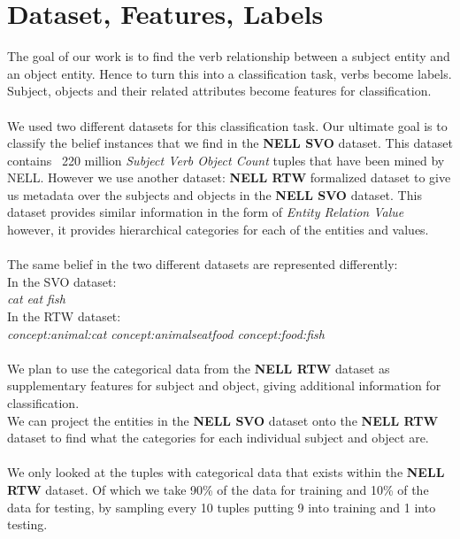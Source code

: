 \section{Dataset, Features, Labels}

The goal of our work is to find the verb relationship between a subject entity and an object entity. Hence to turn this into a classification task, verbs become labels. Subject, objects and their related attributes become features for classification.\\
\\
We used two different datasets for this classification task. Our ultimate goal is to classify the belief instances that we find in the \textbf{NELL SVO} dataset. This dataset contains ~220 million \emph{Subject Verb Object Count} tuples that have been mined by NELL. However we use another dataset: \textbf{NELL RTW} formalized dataset to give us metadata over the subjects and objects in the \textbf{NELL SVO} dataset. This dataset provides similar information in the form of \emph{Entity Relation Value} however, it provides hierarchical categories for each of the entities and values.\\
\\
The same belief in the two different datasets are represented differently:\\
In the SVO dataset:\\
\emph{cat eat fish}\\
In the RTW dataset:\\
\emph{concept:animal:cat concept:animalseatfood concept:food:fish}\\
\\
We plan to use the categorical data from the \textbf{NELL RTW} dataset as supplementary features for subject and object, giving additional information for classification.\\ We can project the entities in the \textbf{NELL SVO} dataset onto the \textbf{NELL RTW} dataset to find what the categories for each individual subject and object are.\\
\\
We only looked at the tuples with categorical data that exists within the \textbf{NELL RTW} dataset. Of which we take 90\% of the data for training and 10\% of the data for testing, by sampling every 10 tuples putting 9 into training and 1 into testing. 